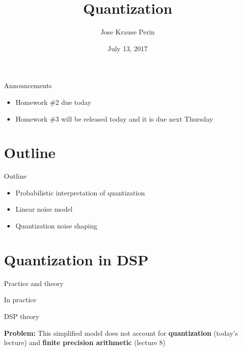 \documentclass[10pt]{beamer}
\title[EE 264]{Quantization}
\author{Jose Krause Perin}
\institute{Stanford University}
\date{July 13, 2017}
\begin{document}
\begin{frame}
  \titlepage
\end{frame}

%
\begin{frame}{Announcements}
	\begin{itemize}
		\item Homework \#2 due today
		\item Homework \#3 will be released today and it is due next Thursday
	\end{itemize}
\end{frame}


%
\section{Outline}
\begin{frame}{Outline}
\begin{itemize}
	\item Probabilistic interpretation of quantization
	\item Linear noise model
	\item Quantization noise shaping
\end{itemize}
\end{frame}

%
\section{Quantization in DSP}
\begin{frame}{Practice and theory}
\begin{block}{In practice}
	\begin{center}
		\resizebox{\linewidth}{!}{}
	\end{center}
\end{block}

\begin{block}{DSP theory}
	\begin{center}
		\resizebox{\linewidth}{!}{}
	\end{center}

	\textbf{Problem:} This simplified model does not account for \textbf{quantization} (today's lecture) and \textbf{finite precision arithmetic} (lecture 8)
\end{block}
\end{frame}
\end{document}

